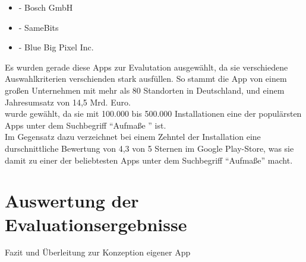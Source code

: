 \begin{itemize}
  \item \mm{} - Bosch GmbH
  \item \ms{} - SameBits
  \item \pm{} - Blue Big Pixel Inc.
\end{itemize}

\noindent
{} 
Es wurden gerade diese Apps zur Evalutation ausgewählt, da sie verschiedene Auswahlkriterien verschienden stark ausfüllen.
So stammt die App \mm{} von einem großen Unternehmen mit mehr als 80 Standorten in Deutschland, und einem Jahresumsatz von 14,5 Mrd. Euro. \\
\ms{} wurde gewählt, da sie mit 100.000 bis 500.000 Installationen eine der populärsten Apps unter dem Suchbegriff ``Aufmaße '' ist. \\
Im Gegensatz dazu verzeichnet \pm{} bei einem Zehntel der Installation eine durschnittliche Bewertung von 4,3 von 5 Sternen im Google Play-Store, was sie damit zu einer der beliebtesten Apps unter dem Suchbegriff ``Aufmaße'' macht.





\section{Auswertung der Evaluationsergebnisse}
Fazit und Überleitung zur Konzeption eigener App
